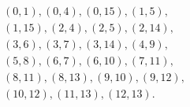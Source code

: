 \begin{equation}\label{eq:secondary-missing}
\begin{gathered}
 (0,1),(0,4),(0,15),(1,5),\\
 (1,15),(2,4),(2,5),(2,14),\\
 (3,6),(3,7),(3,14),(4,9),\\
 (5,8),(6,7),(6,10),(7,11),\\
 (8,11),(8,13),(9,10),(9,12),\\
 (10,12),(11,13),(12,13).
\end{gathered}
\end{equation}
